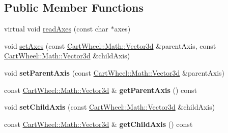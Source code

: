 \subsection*{Public Member Functions}
\begin{DoxyCompactItemize}
\item 
virtual void \hyperlink{classCartWheel_1_1Physics_1_1UniversalJoint_ac2bbb40eff30cfce3979b0334ce8c88b}{readAxes} (const char $\ast$axes)
\item 
void \hyperlink{classCartWheel_1_1Physics_1_1UniversalJoint_a98dbd73937ef7d9fede94f9c259388b5}{setAxes} (const \hyperlink{classCartWheel_1_1Math_1_1Vector3d}{CartWheel::Math::Vector3d} \&parentAxis, const \hyperlink{classCartWheel_1_1Math_1_1Vector3d}{CartWheel::Math::Vector3d} \&childAxis)
\item 
\hypertarget{classCartWheel_1_1Physics_1_1UniversalJoint_a923a09aa22e37e01433b9d219169f0fc}{
void {\bfseries setParentAxis} (const \hyperlink{classCartWheel_1_1Math_1_1Vector3d}{CartWheel::Math::Vector3d} \&parentAxis)}
\label{classCartWheel_1_1Physics_1_1UniversalJoint_a923a09aa22e37e01433b9d219169f0fc}

\item 
\hypertarget{classCartWheel_1_1Physics_1_1UniversalJoint_acf654b1d74ded0c5da52e7f24bf30db4}{
const \hyperlink{classCartWheel_1_1Math_1_1Vector3d}{CartWheel::Math::Vector3d} \& {\bfseries getParentAxis} () const }
\label{classCartWheel_1_1Physics_1_1UniversalJoint_acf654b1d74ded0c5da52e7f24bf30db4}

\item 
\hypertarget{classCartWheel_1_1Physics_1_1UniversalJoint_aeeb7d68c1cb77fdc125d7e5f9dd4754c}{
void {\bfseries setChildAxis} (const \hyperlink{classCartWheel_1_1Math_1_1Vector3d}{CartWheel::Math::Vector3d} \&childAxis)}
\label{classCartWheel_1_1Physics_1_1UniversalJoint_aeeb7d68c1cb77fdc125d7e5f9dd4754c}

\item 
\hypertarget{classCartWheel_1_1Physics_1_1UniversalJoint_a633b3ebdd6a606dc49be2fb11a45a933}{
const \hyperlink{classCartWheel_1_1Math_1_1Vector3d}{CartWheel::Math::Vector3d} \& {\bfseries getChildAxis} () const }
\label{classCartWheel_1_1Physics_1_1UniversalJoint_a633b3ebdd6a606dc49be2fb11a45a933}


\end{DoxyCompactItemize}
